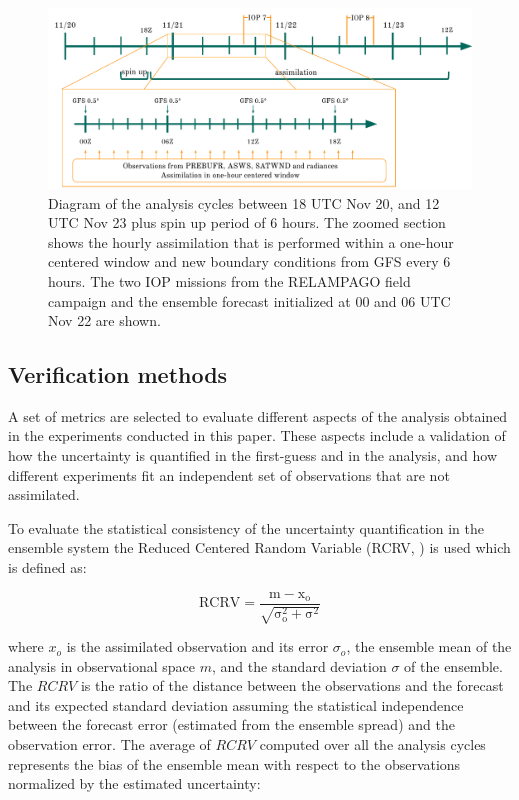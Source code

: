 \documentclass[final,5p,times,twocolumn,authoryear]{elsarticle} %
\begin{document}
\begin{figure}
\includegraphics[width=1\linewidth]{../figures/analysis_cycle} \caption{Diagram of the analysis cycles between 18 UTC Nov 20, and 12 UTC Nov 23 plus spin up period of 6 hours. The zoomed section shows the hourly assimilation that is performed within a one-hour centered window and new boundary conditions from GFS every 6 hours. The two IOP missions from the RELAMPAGO field campaign and the ensemble forecast initialized at 00 and 06 UTC Nov 22 are shown.}\label{fig:cycle}
\end{figure}

\hypertarget{verification-methods}{%
\subsection{Verification methods}\label{verification-methods}}

A set of metrics are selected to evaluate different aspects of the analysis obtained in the experiments conducted in this paper. These aspects include a validation of how the uncertainty is quantified in the first-guess and in the analysis, and how different experiments fit an independent set of observations that are not assimilated.

To evaluate the statistical consistency of the uncertainty quantification in the ensemble system the Reduced Centered Random Variable (RCRV, \citet{candille2007}) is used which is defined as:

\begin{equation}
  \mathrm{RCRV = \frac{m - x_o}{\sqrt{\sigma_o^2 + \sigma^2}}}
  \label{eq:eq2}
\end{equation}

where \(x_o\) is the assimilated observation and its error \(\sigma_o\), the ensemble mean of the analysis in observational space \(m\), and the standard deviation \(\sigma\) of the ensemble. The \(RCRV\) is the ratio of the distance between the observations and the forecast and its expected standard deviation assuming the statistical independence between the forecast error (estimated from the ensemble spread) and the observation error. The average of \(RCRV\) computed over all the analysis cycles represents the bias of the ensemble mean with respect to the observations normalized by the estimated uncertainty:
\end{document}
